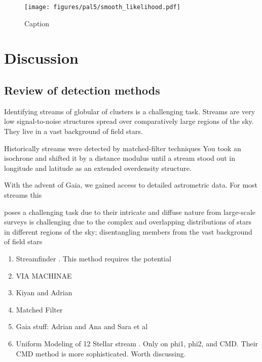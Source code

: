 \documentclass[twocolumn]{aastex631}
\begin{document}
        \begin{figure*}
            \centering
            \texttt{[image: figures/pal5/smooth\_likelihood.pdf]}
            \caption{Caption}
            \label{fig:pal5-heatmap}
        \end{figure*}





\section{Discussion}

    \subsection{Review of detection methods}

        Identifying streams of globular of clusters is a challenging task.
        Streams are very low signal-to-noise structures spread over
        comparatively large regions of the sky. They live in a vast background
        of field stars.

        Historically streams were detected by matched-filter techniques
        You took an isochrone and shifted it by a distance modulus until a
        stream stood out in longitude and latitude as an extended overdensity
        structure.

        With the advent of Gaia, we gained access to detailed astrometric data.
        For most streams this 
        
        poses a challenging task due to their intricate and diffuse nature from
        large-scale surveys is challenging due to the complex and overlapping
        distributions of stars in different regions of the sky; disentangling
        members from the vast background of field stars 
    
        \begin{enumerate}
            \item Streamfinder \citep{STREAMFINDER}. This method requires the
            potential
            \item VIA MACHINAE \citep{Shih+2022}
            \item Kiyan and Adrian
            \item Matched Filter
            \item Gaia stuff: Adrian and Ana and Sara et al
            \item Uniform Modeling of 12 Stellar stream \citep{Patrick+2022}.
            Only on phi1, phi2, and CMD. Their CMD method is more sophisticated.
            Worth discussing.
        \end{enumerate}
\end{document}
